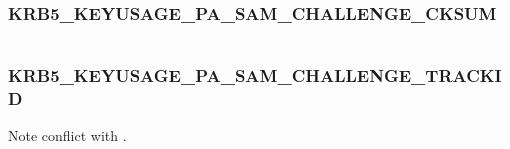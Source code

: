 \documentclass[letterpaper,10pt,english]{sphinxmanual}
\begin{document}
\subsubsection{KRB5\_KEYUSAGE\_PA\_SAM\_CHALLENGE\_CKSUM}
\label{appdev/refs/macros/KRB5_KEYUSAGE_PA_SAM_CHALLENGE_CKSUM::doc}\label{appdev/refs/macros/KRB5_KEYUSAGE_PA_SAM_CHALLENGE_CKSUM:krb5-keyusage-pa-sam-challenge-cksum-data}\label{appdev/refs/macros/KRB5_KEYUSAGE_PA_SAM_CHALLENGE_CKSUM:krb5-keyusage-pa-sam-challenge-cksum}

\begin{fulllineitems}
\label{appdev/refs/macros/KRB5_KEYUSAGE_PA_SAM_CHALLENGE_CKSUM:KRB5_KEYUSAGE_PA_SAM_CHALLENGE_CKSUM}
\end{fulllineitems}


\begin{tabulary}{\linewidth}{|L|L|}
\hline

 & 
\\\hline
\end{tabulary}



\subsubsection{KRB5\_KEYUSAGE\_PA\_SAM\_CHALLENGE\_TRACKID}
\label{appdev/refs/macros/KRB5_KEYUSAGE_PA_SAM_CHALLENGE_TRACKID:krb5-keyusage-pa-sam-challenge-trackid}\label{appdev/refs/macros/KRB5_KEYUSAGE_PA_SAM_CHALLENGE_TRACKID:krb5-keyusage-pa-sam-challenge-trackid-data}\label{appdev/refs/macros/KRB5_KEYUSAGE_PA_SAM_CHALLENGE_TRACKID::doc}

\begin{fulllineitems}
\label{appdev/refs/macros/KRB5_KEYUSAGE_PA_SAM_CHALLENGE_TRACKID:KRB5_KEYUSAGE_PA_SAM_CHALLENGE_TRACKID}
\end{fulllineitems}


Note conflict with  .

\begin{tabulary}{\linewidth}{|L|L|}
\hline

 & 
\\\hline
\end{tabulary}
\end{document}

